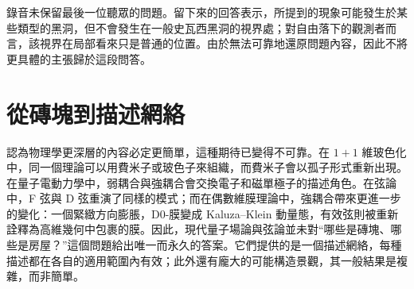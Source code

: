 \begin{classroomqa}
\end{classroomqa}


錄音未保留最後一位聽眾的問題。留下來的回答表示，所提到的現象可能發生於某些類型的黑洞，但不會發生在一般史瓦西黑洞的視界處；對自由落下的觀測者而言，該視界在局部看來只是普通的位置。由於無法可靠地還原問題內容，因此不將更具體的主張歸於這段問答。

\section{從磚塊到描述網絡}

認為物理學更深層的內容必定更簡單，這種期待已變得不可靠。在 \(1+1\) 維玻色化中，同一個理論可以用費米子或玻色子來組織，而費米子會以孤子形式重新出現。在量子電動力學中，弱耦合與強耦合會交換電子和磁單極子的描述角色。在弦論中，F 弦與 D 弦重演了同樣的模式；而在偶數維膜理論中，強耦合帶來更進一步的變化：一個緊緻方向膨脹，D0-膜變成 Kaluza--Klein 動量態，有效弦則被重新詮釋為高維幾何中包裹的膜。因此，現代量子場論與弦論並未對``哪些是磚塊、哪些是房屋？''這個問題給出唯一而永久的答案。它們提供的是一個描述網絡，每種描述都在各自的適用範圍內有效；此外還有龐大的可能構造景觀，其一般結果是複雜，而非簡單。
